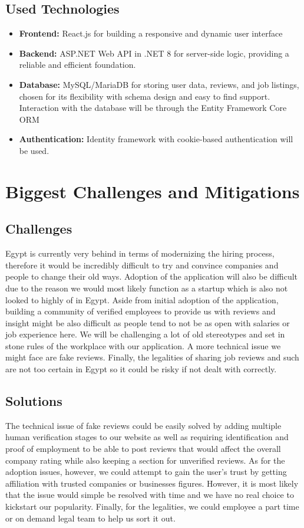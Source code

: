 \documentclass[titlepage]{article}
\begin{document}
\subsection{Used Technologies}
\begin{itemize}
    \item \textbf{Frontend:} React.js for building a responsive and dynamic user interface
    \item \textbf{Backend:} ASP.NET Web API in .NET 8 for server-side logic, providing a reliable and efficient foundation.
    \item \textbf{Database:} MySQL/MariaDB for storing user data, reviews, and job listings, chosen for its flexibility with 
    schema design and easy to find support. Interaction with the database will be through the Entity Framework 
    Core ORM
    \item \textbf{Authentication:} Identity framework with cookie-based authentication will be used.
\end{itemize}

\newpage

\section{Biggest Challenges and Mitigations}
\subsection{Challenges}
Egypt is currently very behind in terms of modernizing the hiring process, therefore it would be incredibly 
difficult to try and convince companies and people to change their old ways. Adoption of the application will 
also be difficult due to the reason we would most likely function as a startup which is also not looked to highly 
of in Egypt. Aside from initial adoption of the application, building a community of verified employees to 
provide us with reviews and insight might be also difficult as people tend to not be as open with salaries or job 
experience here. We will be challenging a lot of old stereotypes and set in stone rules of the workplace with our 
application. A more technical issue we might face are fake reviews. Finally, the legalities of sharing job reviews 
and such are not too certain in Egypt so it could be risky if not dealt with correctly.

\subsection{Solutions}
The technical issue of fake reviews could be easily solved by adding multiple human verification stages to our 
website as well as requiring identification and proof of employment to be able to post reviews that would affect 
the overall company rating while also keeping a section for unverified reviews. As for the adoption issues,
however, we could attempt to gain the user’s trust by getting affiliation with trusted companies or businesses 
figures. However, it is most likely that the issue would simple be resolved with time and we have no real choice 
to kickstart our popularity. Finally, for the legalities, we could employee a part time or on demand legal team to 
help us sort it out.
\end{document}
